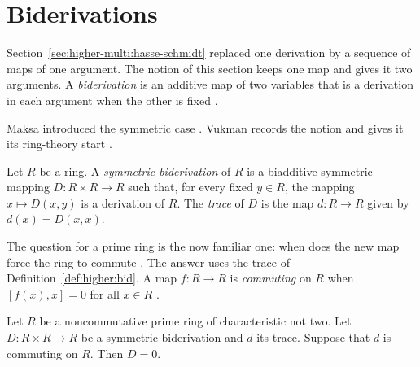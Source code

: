 \section{Biderivations}\label{sec:higher-multi:biderivations}

Section~\ref{sec:higher-multi:hasse-schmidt} replaced one derivation by a
sequence of maps of one argument. The notion of this section keeps one map
and gives it two arguments. A \emph{biderivation} is an additive map of two
variables that is a derivation in each argument when the other is fixed
\cite[p.~245]{Vukman1989Bid}.

Maksa introduced the symmetric case
\cite[references~5 and~6]{Vukman1989Bid}. Vukman records the notion and gives
it its ring-theory start \cite[p.~245]{Vukman1989Bid}.

\begin{definition}\label{def:higher:bid}
Let $R$ be a ring. A \emph{symmetric biderivation} of $R$ is a biadditive
symmetric mapping $D\colon R\times R\to R$ such that, for every fixed $y\in
R$, the mapping $x\mapsto D(x,y)$ is a derivation of $R$. The \emph{trace}
of $D$ is the map $d\colon R\to R$ given by $d(x)=D(x,x)$.
\end{definition}

The question for a prime ring is the now familiar one: when does the new map
force the ring to commute \cite[p.~245]{Vukman1989Bid}. The answer uses the
trace of Definition~\ref{def:higher:bid}. A map $f\colon R\to R$ is
\emph{commuting} on $R$ when $[f(x),x]=0$ for all $x\in R$
\cite[p.~246]{Vukman1989Bid}.

\begin{theorem}\label{thm:higher:bid-commuting}
Let $R$ be a noncommutative prime ring of characteristic not two. Let
$D\colon R\times R\to R$ be a symmetric biderivation and $d$ its trace.
Suppose that $d$ is commuting on $R$. Then $D=0$.
\end{theorem}

